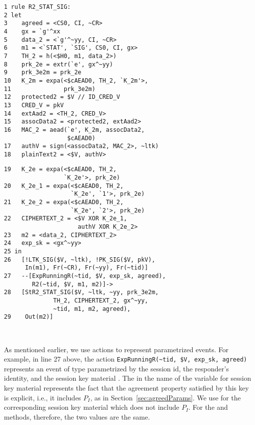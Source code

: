 {
\bgroup
\parindent 0pt
\begin{minipage}{0.49\textwidth}
\bgroup
\parindent 0pt
\begin{scriptsize}
\begin{verbatim}
1 rule R2_STAT_SIG:
2 let
3    agreed = <CS0, CI, ~CR>
4    gx = `g'^xx
5    data_2 = <`g'^~yy, CI, ~CR>
6    m1 = <`STAT', `SIG', CS0, CI, gx>
7    TH_2 = h(<$H0, m1, data_2>)
8    prk_2e = extr(`e', gx^~yy)
9    prk_3e2m = prk_2e
10   K_2m = expa(<$cAEAD0, TH_2, `K_2m'>,
11               prk_3e2m)
12   protected2 = $V // ID_CRED_V
13   CRED_V = pkV
14   extAad2 = <TH_2, CRED_V>
15   assocData2 = <protected2, extAad2>
16   MAC_2 = aead(`e', K_2m, assocData2,
                  $cAEAD0)
17   authV = sign(<assocData2, MAC_2>, ~ltk)
18   plainText2 = <$V, authV>
\end{verbatim}
\end{scriptsize}
\egroup
\end{minipage}
\begin{minipage}{0.02\textwidth}
\end{minipage}
\begin{minipage}{0.48\textwidth}
\bgroup
\parindent 0pt
\begin{scriptsize}
\begin{verbatim}
19   K_2e = expa(<$cAEAD0, TH_2,
                 `K_2e'>, prk_2e)
20   K_2e_1 = expa(<$cAEAD0, TH_2,
                   `K_2e', `1'>, prk_2e)
21   K_2e_2 = expa(<$cAEAD0, TH_2,
                   `K_2e', `2'>, prk_2e)
22   CIPHERTEXT_2 = <$V XOR K_2e_1,
                     authV XOR K_2e_2>
23   m2 = <data_2, CIPHERTEXT_2>
24   exp_sk = <gx^~yy>
25 in
26   [!LTK_SIG($V, ~ltk), !PK_SIG($V, pkV),
      In(m1), Fr(~CR), Fr(~yy), Fr(~tid)]
27   --[ExpRunningR(~tid, $V, exp_sk, agreed),
        R2(~tid, $V, m1, m2)]->
28   [StR2_STAT_SIG($V, ~ltk, ~yy, prk_3e2m,
              TH_2, CIPHERTEXT_2, gx^~yy,
              ~tid, m1, m2, agreed),
29    Out(m2)]
\end{verbatim}
\end{scriptsize}
\egroup
\end{minipage}
\\
\egroup
%
}

As mentioned earlier, we use actions to represent parametrized events.
%
For example, in line 27 above, the action
\verb|ExpRunningR(~tid, $V, exp_sk, agreed)| represents an event of type
\mRStart{} parametrized by the session id, the responder's identity, and the
session key material .
%
The  in the name of the variable for session key material represents
the fact that the agreement property satisfied by this key is explicit, i.e.,
it includes $P_{I}$, as in Section~\ref{sec:agreedParams}.
%
We use  for the corresponding session key material which does not
include $P_{I}$.
%
For the \mSigSig{} and \mSigStat{} methods, therefore, the two values are the same.
%

